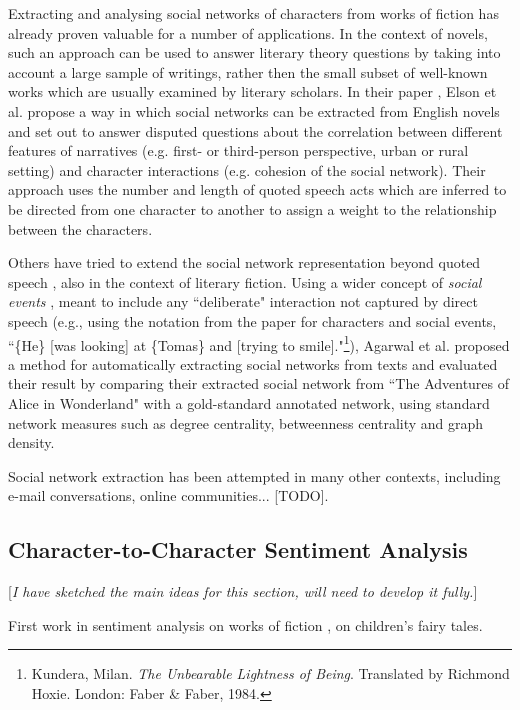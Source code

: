 \documentclass[bsc,frontabs,singlespacing,parskip]{infthesis} %
\begin{document}
Extracting and analysing social networks of characters from works of fiction has already proven valuable for a number of applications. In the context of novels, such an approach can be used to answer literary theory questions by taking into account a large sample of writings, rather then the small subset of well-known works which are usually examined by literary scholars. In their paper \cite{Elson2010}, Elson et al. propose a way in which social networks can be extracted from English novels and set out to answer disputed questions about the correlation between different features of narratives (e.g. first- or third-person perspective, urban or rural setting) and character interactions (e.g. cohesion of the social network). Their approach uses the number and length of quoted speech acts which are inferred to be directed from one character to another to assign a weight to the relationship between the characters.

Others have tried to extend the social network representation beyond quoted speech \cite{Agarwal2013}, also in the context of literary fiction. Using a wider concept of \textit{social events} \cite{agarwal2010annotation}, meant to include any ``deliberate" interaction not captured by direct speech (e.g., using the notation from the paper for characters and social events, ``\{He\} [was looking] at \{Tomas\} and [trying to smile]."\footnote{Kundera, Milan. \textit{The Unbearable Lightness of Being}. Translated by Richmond Hoxie. London: Faber \& Faber, 1984.}), Agarwal et al. proposed a method for automatically extracting social networks from texts and evaluated their result  by comparing their extracted social network from ``The Adventures of Alice in Wonderland" with a gold-standard annotated network, using standard network measures such as degree centrality, betweenness centrality and graph density.

Social network extraction has been attempted in many other contexts, including e-mail conversations, online communities... [TODO]. 

\subsection{Character-to-Character Sentiment Analysis}

[\textit{I have sketched the main ideas for this section, will need to develop it fully.}]

First work in sentiment analysis on works of fiction \cite{alm2005emotions}, on children's fairy tales.
\end{document}
